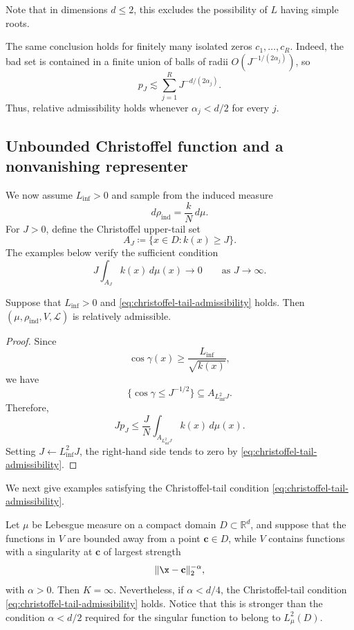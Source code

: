 \documentclass[10pt,dvipsnames]{amsart}
\begin{document}
Note that in dimensions $d\leq2$, this excludes the possibility of $L$ having simple roots. 

\begin{remark}
The same conclusion holds for finitely many isolated zeros
\(c_1,\ldots,c_R\). Indeed, the bad set is contained in a finite union of
balls of radii \(O(J^{-1/(2\alpha_j)})\), so
\[
    p_J
    \lesssim
    \sum_{j=1}^R J^{-d/(2\alpha_j)}.
\]
Thus, relative admissibility holds whenever
\(\alpha_j<d/2\) for every \(j\).
\end{remark}


\subsection{Unbounded Christoffel function and a nonvanishing representer}
\label{ssec:infinite-K-positive-Linf}

We now assume \(L_{\inf}>0\) and sample from the induced measure
\[
    d\rho_{\mathrm{ind}}
    =
    \frac{k}{N}\,d\mu.
\]
For \(J>0\), define the Christoffel upper-tail set
\[
    A_J
    \coloneqq
    \{x\in D:k(x)\geq J\}.
\]
The examples below verify the sufficient condition
\begin{equation}
\label{eq:christoffel-tail-admissibility}
    J\int_{A_J}k(x)\,d\mu(x)
    \longrightarrow0
    \qquad\text{as }J\to\infty.
\end{equation}

\begin{lemma}
\label{lem:induced-tail-admissibility}
Suppose that \(L_{\inf}>0\) and
\eqref{eq:christoffel-tail-admissibility} holds. Then
\((\mu,\rho_{\mathrm{ind}},V,\mathcal L)\) is relatively admissible.
\end{lemma}

\begin{proof}
Since
\[
    \cos\gamma(x)
    \geq
    \frac{L_{\inf}}{\sqrt{k(x)}},
\]
we have
\[
    \{\cos\gamma\leq J^{-1/2}\}
    \subseteq
    A_{L_{\inf}^2J}.
\]
Therefore,
\[
    Jp_J
    \leq
    \frac{J}{N}
    \int_{A_{L_{\inf}^2J}}k(x)\,d\mu(x).
\]
Setting \(J\gets L_{\inf}^2J\), the right-hand side tends to zero by
\eqref{eq:christoffel-tail-admissibility}.
\end{proof}

We next give examples satisfying the Christoffel-tail condition
\eqref{eq:christoffel-tail-admissibility}.

\begin{example}
\label{ex:singularity}
Let \(\mu\) be Lebesgue measure on a compact domain
\(D\subset\mathbb R^d\), and suppose that the functions in \(V\) are bounded
away from a point \(\mathbf{c}\in D\), while \(V\) contains functions with 
a singularity at $\mathbf{c}$ of largest strength
\[
    \|\x-\mathbf{c}\|_2^{-\alpha},
\]
with $\alpha>0$. Then \(K=\infty\). Nevertheless, if \(\alpha<d/4\), the Christoffel-tail
condition \eqref{eq:christoffel-tail-admissibility} holds. Notice that this
is stronger than the condition \(\alpha<d/2\) required for the singular
function to belong to \(L^2_\mu(D)\).
\end{example}
\end{document}
